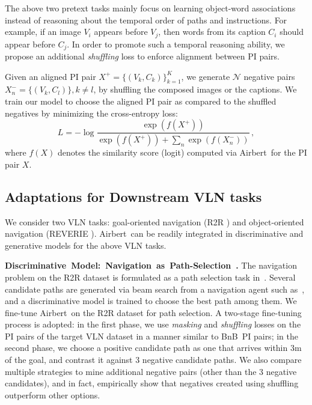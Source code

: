 \RequirePackage[dvipsnames,table]{xcolor} \documentclass[10pt,twocolumn,letterpaper]{article}
\newcommand{\p}[1]{\vspace{1mm}\noindent\textbf{#1}}
\newcommand{\airbert}{Airbert}
\newcommand{\airbnb}{BnB}
\newcommand{\mcN}{\mathcal{N}}
\begin{document}
The above two pretext tasks mainly focus on learning object-word associations instead of reasoning about the temporal order of paths and instructions.
For example, if an image $V_i$ appears before $V_j$, then words from its caption $C_i$ should appear before $C_j$.
In order to promote such a temporal reasoning ability, we propose an additional \emph{shuffling} loss to enforce alignment between PI pairs.

Given an aligned PI pair $X^+ = \{(V_k, C_k)\}_{k=1}^K$, we generate $\mcN$ negative pairs $X^-_n = \{(V_k, C_l)\}, k\neq l$, by shuffling the composed images or the captions.
We train our model to choose the aligned PI pair as compared to the shuffled negatives by minimizing the cross-entropy loss:
\begin{equation}
L = -\log \frac{\exp(f(X^+))}{\exp(f(X^+)) + \sum_n \exp(f(X^-_n))} \, ,
\end{equation}
where $f(X)$ denotes the similarity score (logit) computed via \airbert~for the PI pair $X$.


\subsection{Adaptations for Downstream VLN tasks}
\label{sec:downstream}
We consider two VLN tasks: goal-oriented navigation (R2R \cite{anderson2018r2r}) and object-oriented navigation (REVERIE \cite{qi2020reverie}).
\airbert~can be readily integrated in discriminative and generative models for the above VLN tasks.


\p{\mbox{Discriminative Model: Navigation as Path-Selection~\cite{majumdar2020vlnbert}.}}
The navigation problem on the R2R dataset is formulated as a path selection task in~\cite{majumdar2020vlnbert}.
Several candidate paths are generated via beam search from a navigation agent such as~\cite{tan2019envdrop}, and a discriminative model is trained to choose the best path among them.
We fine-tune \airbert~on the R2R dataset for path selection.
A two-stage fine-tuning process is adopted: 
in the first phase, we use \emph{masking} and \emph{shuffling} losses on the PI pairs of the target VLN dataset in a manner similar to \airbnb~PI pairs;
in the second phase, we choose a positive candidate path as one that arrives within 3m of the goal, and contrast it against 3 negative candidate paths.
We also compare multiple strategies to mine additional negative pairs (other than the 3 negative candidates), and in fact, empirically show that negatives created using shuffling outperform other options.
\end{document}
